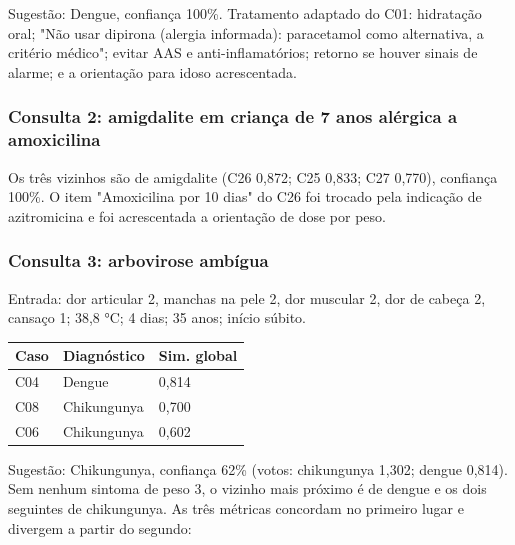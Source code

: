 \documentclass[12pt, a4paper]{article}
\begin{document}
Sugestão: Dengue, confiança 100\%. Tratamento adaptado do C01: hidratação oral; "Não usar dipirona (alergia informada): paracetamol como alternativa, a critério médico"; evitar AAS e anti-inflamatórios; retorno se houver sinais de alarme; e a orientação para idoso acrescentada.

\subsubsection{Consulta 2: amigdalite em criança de 7 anos alérgica a amoxicilina}\label{consulta-2-amigdalite-em-crianuxe7a-de-7-anos-aluxe9rgica-a-amoxicilina}

Os três vizinhos são de amigdalite (C26 0,872; C25 0,833; C27 0,770), confiança 100\%. O item "Amoxicilina por 10 dias" do C26 foi trocado pela indicação de azitromicina e foi acrescentada a orientação de dose por peso.

\subsubsection{Consulta 3: arbovirose ambígua}\label{consulta-3-arbovirose-ambuxedgua}

Entrada: dor articular 2, manchas na pele 2, dor muscular 2, dor de cabeça 2, cansaço 1; 38,8 °C; 4 dias; 35 anos; início súbito.

\begin{longtable}{@{}lll@{}}
\toprule\noalign{}
Caso & Di\-ag\-nós\-tico & Sim. global \\
\midrule\noalign{}
\endhead
\bottomrule\noalign{}
\endlastfoot
C04 & Dengue & 0,814 \\
C08 & Chikungunya & 0,700 \\
C06 & Chikungunya & 0,602 \\
\end{longtable}

Sugestão: Chikungunya, confiança 62\% (votos: chikungunya 1,302; dengue 0,814). Sem nenhum sintoma de peso 3, o vizinho mais próximo é de dengue e os dois seguintes de chikungunya. As três métricas concordam no primeiro lugar e divergem a partir do segundo:
\end{document}
